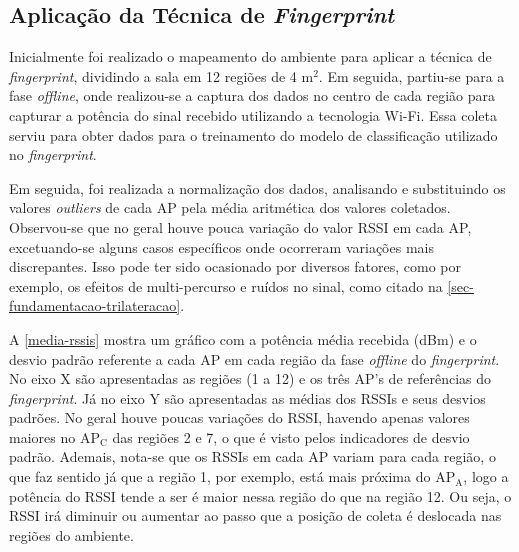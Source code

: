 \documentclass[12pt]{artigoifce}
\begin{document}
\subsection{Aplicação da Técnica de \textit{Fingerprint}}
\label{sec-resultados-fingerprint}

Inicialmente foi realizado o mapeamento do ambiente para aplicar a técnica de \textit{fingerprint}, dividindo a sala em 12 regiões de 4 m$^2$. Em seguida, partiu-se para a fase \textit{offline}, onde realizou-se a captura dos dados no centro de cada região para capturar a potência do sinal recebido utilizando a tecnologia Wi-Fi. Essa coleta serviu para obter dados para o treinamento do modelo de classificação utilizado no \textit{fingerprint}. 

Em seguida, foi realizada a normalização dos dados, analisando e substituindo os valores \textit{outliers} de cada AP pela média aritmética dos valores coletados. Observou-se que no geral houve pouca variação do valor RSSI em cada AP, excetuando-se alguns casos específicos onde ocorreram variações mais discrepantes. Isso pode ter sido ocasionado por diversos fatores, como por exemplo, os efeitos de multi-percurso e ruídos no sinal, como citado na \autoref{sec-fundamentacao-trilateracao}.

A \autoref{media-rssis} mostra um gráfico com a potência média recebida (dBm) e o desvio padrão referente a cada AP em cada região da fase \textit{offline} do \textit{fingerprint}. No eixo X são apresentadas as regiões (1 a 12) e os três AP's de referências do \textit{fingerprint}. Já no eixo Y são apresentadas as médias dos RSSIs e seus desvios padrões. No geral houve poucas variações do RSSI, havendo apenas valores maiores no AP$_\text{C}$ das regiões 2 e 7, o que é visto pelos indicadores de desvio padrão. Ademais, nota-se que os RSSIs em cada AP variam para cada região, o que faz sentido já que a região 1, por exemplo, está mais próxima do AP$_\text{A}$, logo a potência do RSSI tende a ser é maior nessa região do que na região 12. Ou seja, o RSSI irá diminuir ou aumentar ao passo que a posição de coleta é deslocada nas regiões do ambiente.
\end{document}
